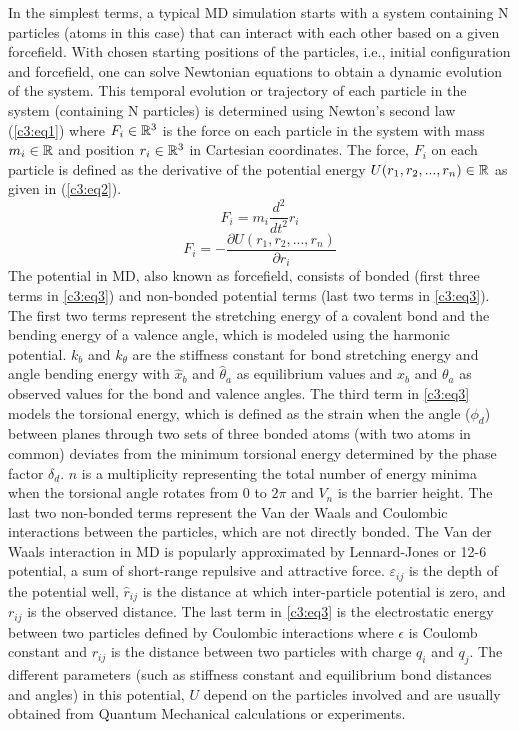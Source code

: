 In the simplest terms, a typical MD simulation starts with a system containing N particles (atoms in this case) that can interact with each other based on a given forcefield. 
With chosen starting positions of the particles, i.e., initial configuration and forcefield, one can solve Newtonian equations to obtain a dynamic evolution of the system. 
This temporal evolution or trajectory of each particle in the system (containing N particles) is determined using Newton's second law (\cref{c3:eq1}) where $F_i \in {\mathbb R}^3$ is the force on each particle in the system with mass $m_i \in {\mathbb R}$ and position $r_i \in {\mathbb R}^3$ in Cartesian coordinates. 
The force, $F_i$ on each particle is defined as the derivative of the potential energy $U (r_1,r_2,...,r_n) \in {\mathbb R}$ as given in (\cref{c3:eq2}). 
\begin{equation}
F_i =  m_i \frac{d^2}{dt^2}r_i
\label{c3:eq1}
\end{equation}
\begin{equation}
F_i =  -\frac{\partial{U(r_1,r_2,...,r_n)}}{\partial{r_i}}
\label{c3:eq2}
\end{equation}
The potential in MD, also known as forcefield, consists of bonded (first three terms in \cref{c3:eq3}) and non-bonded potential terms (last two terms in \cref{c3:eq3}). 
The first two terms represent the stretching energy of a covalent bond and the bending energy of a valence angle, which is modeled using the harmonic potential. 
$k_b$ and $k_{\theta}$ are the stiffness constant for bond stretching energy and angle bending energy with $\hat{x}_b$ and $\hat{\theta}_a$ as equilibrium values and $x_b$ and $\theta_a$ as observed values for the bond and valence angles.
The third term in \cref{c3:eq3} models the torsional energy, which is defined as the strain when the angle ($\phi_d$) between planes through two sets of three bonded atoms (with two atoms in common) deviates from the minimum torsional energy determined by the phase factor $\delta_d$. 
$n$ is a multiplicity representing the total number of energy minima when the torsional angle rotates from $0$ to $2\pi$ and $V_n$ is the barrier height.
The last two non-bonded terms represent the Van der Waals and Coulombic interactions between the particles, which are not directly bonded. 
The Van der Waals interaction in MD is popularly approximated by Lennard-Jones or 12-6 potential, a sum of short-range repulsive and attractive force. $\varepsilon_{ij}$ is the depth of the potential well, $\hat{r}_{ij}$ is the distance at which inter-particle potential is zero, and $r_{ij}$ is the observed distance. 
The last term in \cref{c3:eq3} is the electrostatic energy between two particles defined by Coulombic interactions where $\epsilon$ is Coulomb constant and $r_{ij}$ is the distance between two particles with charge $q_i$ and $q_j$. 
The different parameters (such as stiffness constant and equilibrium bond distances and angles) in this potential, $U$ depend on the particles involved and are usually obtained from Quantum Mechanical calculations or experiments. %

